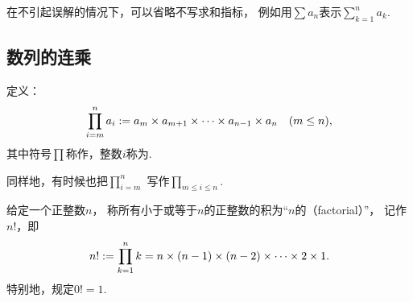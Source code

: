 在不引起误解的情况下，可以省略不写求和指标，
例如用\(\sum a_n\)表示\(\sum_{k=1}^n a_k\).

\subsection{数列的连乘}
\begin{definition}[连乘]
定义：\[
\prod_{i=m}^n a_i
:=
a_m \times a_{m+1} \times \dotsb \times a_{n-1} \times a_n
\quad(m \leq n),
\]其中符号\(\prod\)称作，整数\(i\)称为.
\end{definition}

同样地，有时候也把\(\prod_{i=m}^n\)%
写作\(\prod_{m \leq i \leq n}\).

\begin{definition}\label{definition:数列.阶乘的定义}
给定一个正整数\(n\)，
称所有小于或等于\(n\)的正整数的积为“\(n\)的（factorial）”，
记作\(n!\)，即
\begin{equation}
n!
:=
\prod_{k=1}^n k
=
n \times (n-1) \times (n-2) \times \dotsm \times 2 \times 1.
\end{equation}
特别地，规定\(0! = 1\).
\end{definition}

